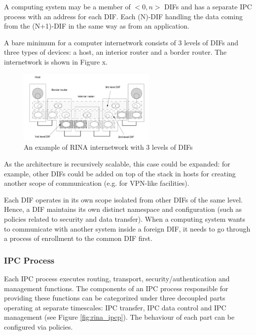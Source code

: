                 A computing system may be a member of $<0,n>$ DIFs and has a separate IPC process with an address for each DIF. Each (N)-DIF handling the data coming from the (N+1)-DIF in the same way as from an application.

                A bare minimum for a computer internetwork consists of 3 levels of DIFs and three types of devices: a host, an interior router and a border router. The internetwork is shown in Figure x.

                \begin{figure}[H]
                    \begin{center}
                        \includegraphics[width=0.6\textwidth]{fig/archs_rina-net.png}
                      \caption{An example of RINA internetwork with 3 levels of DIFs}
                      \label{fig:rina_network}
                    \end{center}
                \end{figure}

                As the architecture is recursively scalable, this case could be expanded: for example, other DIFs could be added on top of the stack in hosts for creating another scope of communication (e.g. for VPN-like facilities).

                Each DIF operates in its own scope isolated from other DIFs of the same level. Hence, a DIF maintains its own distinct namespace and configuration (such as policies related to security and data transfer). When a computing system wants to communicate with another system inside a foreign DIF, it needs to go through a process of enrollment to the common DIF first.

            \subsubsection{IPC Process}

                Each IPC process executes routing, transport, security/authentication and management functions. The components of an IPC process responsible for providing these functions can be categorized under three decoupled parts operating at separate timescales: IPC transfer, IPC data control and IPC management (see Figure \ref{fig:rina_ipcp}). The behaviour of each part can be configured via policies.

